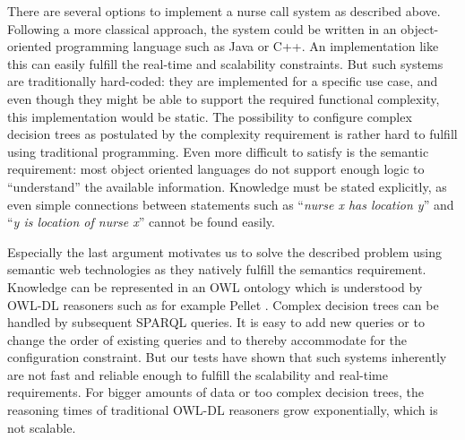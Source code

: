 

There are several options to implement a nurse call system as described above. Following a more classical approach, the system could be written in 
an object-oriented programming language 
such as Java or C++. An implementation like this can easily fulfill the real-time and scalability constraints.
But such systems are traditionally hard-coded: they are implemented for a specific use case, and even though 
they might be able to support the required functional complexity, this implementation would be static. The possibility to configure complex decision trees
as postulated by the complexity requirement is rather hard to fulfill using traditional programming. Even more difficult to satisfy is the semantic requirement:
most object oriented languages do not support enough logic to ``understand'' the available information. Knowledge must be stated explicitly, 
as even simple connections between statements such as ``\textit{nurse x has location y}'' and ``\textit{y is location of nurse x}'' cannot be found easily.

Especially the last argument motivates us to solve the described problem using semantic web technologies as they natively fulfill the semantics requirement.
Knowledge can be represented in an OWL ontology which is understood by OWL-DL reasoners such as for example Pellet \cite{Pellet}. %
Complex decision trees can be handled by subsequent SPARQL queries. It is easy to add new queries or to change the order of existing queries 
and to thereby accommodate for the configuration constraint.
But our tests have shown that such systems inherently are not fast and reliable enough to fulfill the scalability and real-time requirements.
For bigger amounts of data or too complex decision trees, the reasoning times of traditional OWL-DL reasoners grow exponentially, which is not scalable.

